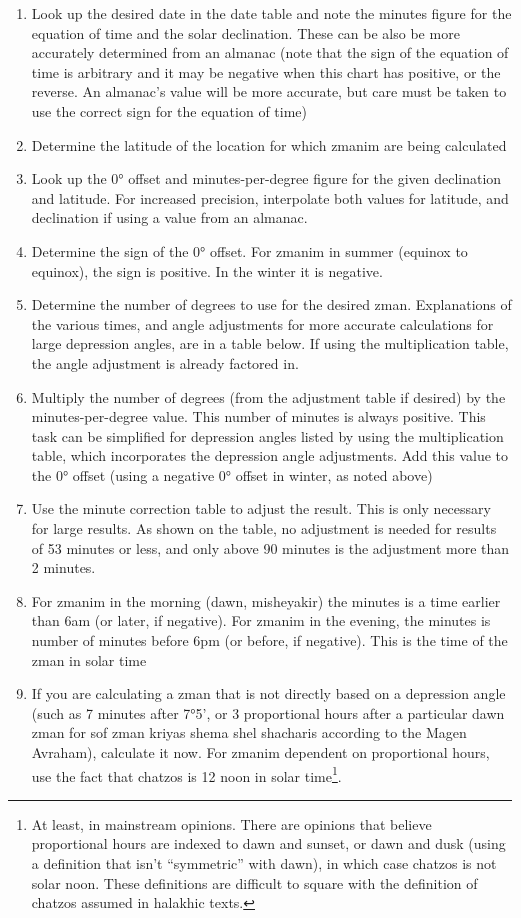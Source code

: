 \begin{enumerate}
	\item Look up the desired date in the date table and note the minutes figure for the equation of time and the solar declination. These can be also be more accurately determined from an almanac (note that the sign of the equation of time is arbitrary and it may be negative when this chart has positive, or the reverse. An almanac's value will be more accurate, but care must be taken to use the correct sign for the equation of time)
	\item Determine the latitude of the location for which zmanim are being calculated
	\item Look up the 0° offset and minutes-per-degree figure for the given declination and latitude. For increased precision, interpolate both values for latitude, and declination if using a value from an almanac.
	\item Determine the sign of the 0° offset. For zmanim in summer (equinox to equinox), the sign is positive. In the winter it is negative.
	\item Determine the number of degrees to use for the desired zman. Explanations of the various times, and angle adjustments for more accurate calculations for large depression angles, are in a table below. If using the multiplication table, the angle adjustment is already factored in.
	\item Multiply the number of degrees (from the adjustment table if desired) by the minutes-per-degree value. This number of minutes is always positive. This task can be simplified for depression angles listed by using the multiplication table, which incorporates the depression angle adjustments. Add this value to the 0° offset (using a negative 0° offset in winter, as noted above)
	\item Use the minute correction table to adjust the result.  This is only necessary for large results.  As shown on the table, no adjustment is needed for results of 53 minutes or less, and only above 90 minutes is the adjustment more than 2 minutes.
	\item For zmanim in the morning (dawn, misheyakir) the minutes is a time earlier than 6am (or later, if negative). For zmanim in the evening, the minutes is number of minutes before 6pm (or before, if negative). This is the time of the zman in solar time
	\item If you are calculating a zman that is not directly based on a depression angle (such as 7 minutes after 7°5', or 3 proportional hours after a particular dawn zman for sof zman kriyas shema shel shacharis according to the Magen Avraham), calculate it now.  For zmanim dependent on proportional hours, use the fact that chatzos is 12 noon in solar time\footnote{At least, in mainstream opinions. There are opinions that believe proportional hours are indexed to dawn and sunset, or dawn and dusk (using a definition that isn't ``symmetric'' with dawn), in which case chatzos is not solar noon. These definitions are difficult to square with the definition of chatzos assumed in halakhic texts.}.

\end{enumerate}
